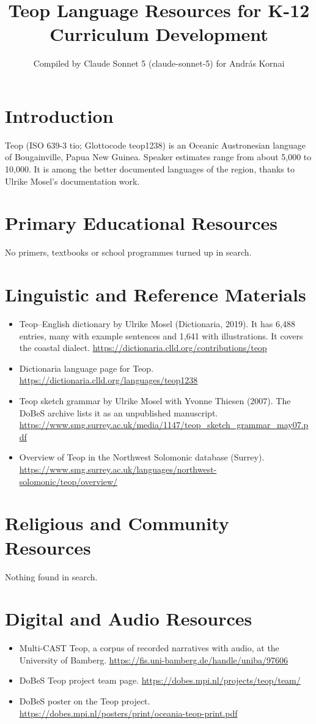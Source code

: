 \documentclass[12pt]{article}
\title{Teop Language Resources for K-12 Curriculum Development}
\author{Compiled by Claude Sonnet 5 (claude-sonnet-5) for Andr\'as Kornai}
\date{}
\begin{document}
\maketitle

\section{Introduction}
Teop (ISO 639-3 tio; Glottocode teop1238) is an Oceanic Austronesian language of Bougainville, Papua New Guinea. Speaker estimates range from about 5,000 to 10,000. It is among the better documented languages of the region, thanks to Ulrike Mosel's documentation work.

\section{Primary Educational Resources}
No primers, textbooks or school programmes turned up in search.

\section{Linguistic and Reference Materials}
\begin{itemize}
\item Teop--English dictionary by Ulrike Mosel (Dictionaria, 2019). It has 6,488 entries, many with example sentences and 1,641 with illustrations. It covers the coastal dialect. \url{https://dictionaria.clld.org/contributions/teop}
\item Dictionaria language page for Teop. \url{https://dictionaria.clld.org/languages/teop1238}
\item Teop sketch grammar by Ulrike Mosel with Yvonne Thiesen (2007). The DoBeS archive lists it as an unpublished manuscript. \url{https://www.smg.surrey.ac.uk/media/1147/teop_sketch_grammar_may07.pdf}
\item Overview of Teop in the Northwest Solomonic database (Surrey). \url{https://www.smg.surrey.ac.uk/languages/northwest-solomonic/teop/overview/}
\end{itemize}

\section{Religious and Community Resources}
Nothing found in search.

\section{Digital and Audio Resources}
\begin{itemize}
\item Multi-CAST Teop, a corpus of recorded narratives with audio, at the University of Bamberg. \url{https://fis.uni-bamberg.de/handle/uniba/97606}
\item DoBeS Teop project team page. \url{https://dobes.mpi.nl/projects/teop/team/}
\item DoBeS poster on the Teop project. \url{https://dobes.mpi.nl/posters/print/oceania-teop-print.pdf}
\end{itemize}
\end{document}
